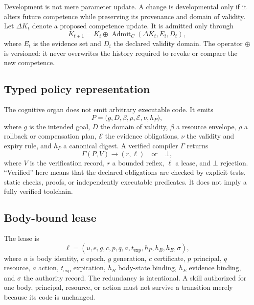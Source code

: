 \documentclass[journal,10pt]{IEEEtran}
\begin{document}
Development is not mere parameter update. A change is developmental only if it alters future competence while preserving its provenance and domain of validity. Let $\Delta K_t$ denote a proposed competence update. It is admitted only through
\begin{equation}
  K_{t+1}=K_t\oplus\operatorname{Admit}_C(\Delta K_t,E_t,D_t), \label{eq:development}
\end{equation}
where $E_t$ is the evidence set and $D_t$ the declared validity domain. The operator $\oplus$ is versioned: it never overwrites the history required to revoke or compare the new competence.

\subsection{Typed policy representation}
The cognitive organ does not emit arbitrary executable code. It emits
\begin{equation}
  P=\bigl(g,D,\beta,\rho,\mathcal E,\nu,h_P\bigr), \label{eq:policyir}
\end{equation}
where $g$ is the intended goal, $D$ the domain of validity, $\beta$ a resource envelope, $\rho$ a rollback or compensation plan, $\mathcal E$ the evidence obligations, $\nu$ the validity and expiry rule, and $h_P$ a canonical digest. A verified compiler $\Gamma$ returns
\begin{equation}
  \Gamma(P,V)\rightarrow (r,\ell) \quad \text{or} \quad \bot, \label{eq:compile}
\end{equation}
where $V$ is the verification record, $r$ a bounded reflex, $\ell$ a lease, and $\bot$ rejection. ``Verified'' here means that the declared obligations are checked by explicit tests, static checks, proofs, or independently executable predicates. It does not imply a fully verified toolchain.

\subsection{Body-bound lease}
The lease is
\begin{equation}
\ell = (u,e,g,c,p,q,a,t_{\mathrm{exp}},h_P,h_B,h_E,\sigma), \label{eq:lease}
\end{equation}
where $u$ is body identity, $e$ epoch, $g$ generation, $c$ certificate, $p$ principal, $q$ resource, $a$ action, $t_{\mathrm{exp}}$ expiration, $h_B$ body-state binding, $h_E$ evidence binding, and $\sigma$ the authority record. The redundancy is intentional. A skill authorized for one body, principal, resource, or action must not survive a transition merely because its code is unchanged.
\end{document}
